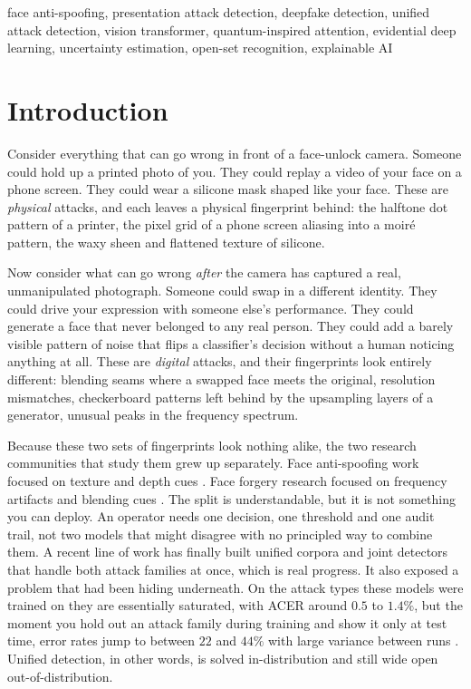 \documentclass[conference]{IEEEtran}
\begin{document}
\begin{IEEEkeywords}
face anti-spoofing, presentation attack detection, deepfake detection, unified
attack detection, vision transformer, quantum-inspired attention, evidential deep
learning, uncertainty estimation, open-set recognition, explainable AI
\end{IEEEkeywords}

\section{Introduction}
Consider everything that can go wrong in front of a face-unlock camera. Someone
could hold up a printed photo of you. They could replay a video of your face on a
phone screen. They could wear a silicone mask shaped like your face. These are
\emph{physical} attacks, and each leaves a physical fingerprint behind: the halftone
dot pattern of a printer, the pixel grid of a phone screen aliasing into a moir\'e
pattern, the waxy sheen and flattened texture of silicone.

Now consider what can go wrong \emph{after} the camera has captured a real,
unmanipulated photograph. Someone could swap in a different identity. They could
drive your expression with someone else's performance. They could generate a face
that never belonged to any real person. They could add a barely visible pattern of
noise that flips a classifier's decision without a human noticing anything at all.
These are \emph{digital} attacks, and their fingerprints look entirely different:
blending seams where a swapped face meets the original, resolution mismatches,
checkerboard patterns left behind by the upsampling layers of a generator, unusual
peaks in the frequency spectrum.

Because these two sets of fingerprints look nothing alike, the two research
communities that study them grew up separately. Face anti-spoofing work focused on
texture and depth cues \cite{liu2018auxiliary,yu2020cdcn,yu2021revisiting,wang2022ssan}.
Face forgery research focused on frequency artifacts and blending cues
\cite{rossler2019ff,li2020celebdf,frank2020frequency,wang2020cnnspot}. The split is
understandable, but it is not something you can deploy. An operator needs one
decision, one threshold and one audit trail, not two models that might disagree
with no principled way to combine them. A recent line of work
\cite{yu2024unified,yuan2024challenge,ma2025uniattackplus,chen2025uniattack,zhang2024unidefense}
has finally built unified corpora and joint detectors that handle both attack
families at once, which is real progress. It also exposed a problem that had been
hiding underneath. On the attack types these models were trained on they are
essentially saturated, with ACER around $0.5$ to $1.4\%$, but the moment you hold out
an attack family during training and show it only at test time, error rates jump to
between $22$ and $44\%$ with large variance between runs \cite{yu2024unified}.
Unified detection, in other words, is solved in-distribution and still wide open
out-of-distribution.
\end{document}
